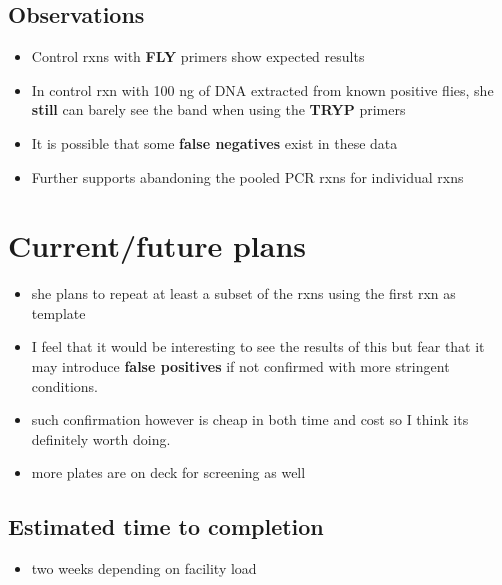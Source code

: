 \documentclass[letterpaper]{scrartcl}
\begin{document}
\subsection{Observations}\label{observations}

\begin{itemize}
\itemsep1pt\parskip0pt
\item
  Control rxns with \textbf{FLY} primers show expected results
\item
  In control rxn with 100 ng of DNA extracted from known positive flies,
  she \textbf{still} can barely see the band when using the
  \textbf{TRYP} primers
\item
  It is possible that some \textbf{false negatives} exist in these data
\item
  Further supports abandoning the pooled PCR rxns for individual rxns
\end{itemize}

\section{Current/future plans}\label{currentfuture-plans}

\begin{itemize}
\itemsep1pt\parskip0pt
\item
  she plans to repeat at least a subset of the rxns using the first rxn
  as template
\item
  I feel that it would be interesting to see the results of this but
  fear that it may introduce \textbf{false positives} if not confirmed
  with more stringent conditions.
\item
  such confirmation however is cheap in both time and cost so I think
  its definitely worth doing.
\item
  more plates are on deck for screening as well
\end{itemize}

\subsection{Estimated time to
completion}\label{estimated-time-to-completion}

\begin{itemize}
\itemsep1pt\parskip0pt
\item
  two weeks depending on facility load
\end{itemize}
\end{document}
